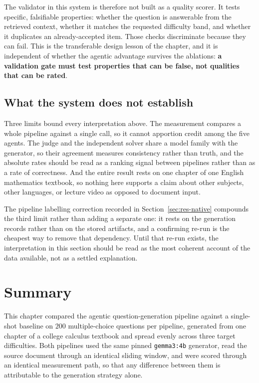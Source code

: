 The validator in this system is therefore not built as a quality scorer. It
tests specific, falsifiable properties: whether the question is answerable from
the retrieved context, whether it matches the requested difficulty band, and
whether it duplicates an already-accepted item. Those checks discriminate
because they can fail. This is the transferable design lesson of the chapter,
and it is independent of whether the agentic advantage survives the ablations:
\textbf{a validation gate must test properties that can be false, not qualities
that can be rated}.

\subsection{What the system does not establish}

Three limits bound every interpretation above. The measurement compares a whole
pipeline against a single call, so it cannot apportion credit among the five
agents. The judge and the independent solver share a model family with the
generator, so their agreement measures consistency rather than truth, and the
absolute rates should be read as a ranking signal between pipelines rather than
as a rate of correctness. And the entire result rests on one chapter of one
English mathematics textbook, so nothing here supports a claim about other
subjects, other languages, or lecture video as opposed to document input.

The pipeline labelling correction recorded in Section~\ref{sec:res-native}
compounds the third limit rather than adding a separate one: it rests on the
generation records rather than on the stored artifacts, and a confirming re-run
is the cheapest way to remove that dependency. Until that re-run exists, the
interpretation in this section should be read as the most coherent account of
the data available, not as a settled explanation.

\section{Summary}
\label{sec:res-summary}

This chapter compared the agentic question-generation pipeline against a
single-shot baseline on $200$ multiple-choice questions per pipeline, generated
from one chapter of a college calculus textbook and spread evenly across three
target difficulties. Both pipelines used the same pinned \texttt{gemma3:4b}
generator, read the source document through an identical sliding window, and
were scored through an identical measurement path, so that any difference
between them is attributable to the generation strategy alone.

